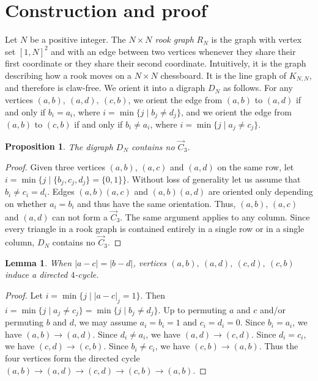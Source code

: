 \documentclass{amsart}
\newtheorem{lemma}{Lemma}
\newtheorem{proposition}{Proposition}
\begin{document}
\section{Construction and proof}

Let $N$ be a positive integer. The \emph{$N \times N$ rook graph} $R_N$ is the graph with vertex set $[1,N]^2$ and with an edge between two vertices whenever they share their first coordinate or they share their second coordinate. Intuitively, it is the graph describing how a rook moves on a $N \times N$ chessboard. It is the line graph of $K_{N,N}$, and therefore is claw-free. We orient it into a digraph $D_N$ as follows. For any vertices $(a,b),\ (a,d),\ (c,b)$, we orient the edge from $(a,b)$ to $(a,d)$ if and only if $b_i = a_i$, where $i = \min\{ j \mid b_j \ne d_j \}$, and we orient the edge from $(a,b)$ to $(c,b)$ if and only if $b_i \ne a_i$, where $i = \min\{ j \mid a_j \ne c_j \}$.

\begin{proposition}
The digraph $D_N$ contains no $\vec C_3$.
\end{proposition}
\begin{proof}
Given three vertices $(a,b)$, $(a,c)$ and $(a,d)$ on the same row, let $i = \min\{j \mid \{b_j, c_j, d_j\} = \{0,1\}\}$. Without loss of generality let us assume that $b_i \ne c_i = d_i$. Edges $(a,b)(a,c)$ and $(a,b)(a,d)$ are oriented only depending on whether $a_i = b_i$ and thus have the same orientation. Thus, $(a,b)$, $(a,c)$ and $(a,d)$ can not form a $\vec C_3$. The same argument applies to any column. Since every triangle in a rook graph is contained entirely in a single row or in a single column, $D_N$ contains no $\vec C_3$.
\end{proof}

\begin{lemma}
When $|a - c| = |b - d|$, vertices $(a,b),\ (a,d),\ (c,d),\ (c,b)$ induce a directed $4$-cycle.
\end{lemma}
\begin{proof}
Let $i=\min \{j \mid |a - c|_{j}  = 1\}$. Then $i = \min\{j \mid a_j \ne c_j\} = \min\{j \mid b_j \ne d_j\}$.
Up to permuting $a$ and $c$ and/or permuting $b$ and $d$, we may assume $a_i = b_i = 1$ and $c_i = d_i = 0$.
Since $b_i = a_i$, we have $(a,b) \to (a,d)$. Since $d_i \ne a_i$, we have $(a,d) \to (c,d)$. Since $d_i = c_i$, we have $(c,d) \to (c,b)$. Since $b_i \ne c_i$, we have $(c,b) \to (a,b)$.
Thus the four vertices form the directed cycle $(a,b) \to (a,d) \to (c,d) \to (c,b) \to (a,b)$.
\end{proof}
\end{document}
